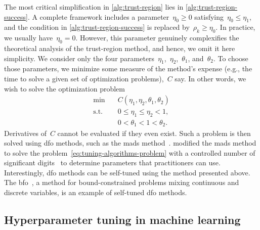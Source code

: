 The most critical simplification in \cref{alg:trust-region} lies in \cref{alg:trust-region-success}.
A complete framework includes a parameter~$\eta_0 \ge 0$ satisfying~$\eta_0 \le \eta_1$, and the condition in \cref{alg:trust-region-success} is replaced by~$\rho_k \ge \eta_0$.
In practice, we usually have~$\eta_0 = 0$.
However, this parameter genuinely complexifies the theoretical analysis of the trust-region method, and hence, we omit it here simplicity.
We consider only the four parameters~$\eta_1$,~$\eta_2$,~$\theta_1$, and~$\theta_2$.
To choose those parameters, we minimize some measure of the method's expense (e.g., the  time to solve a given set of optimization problems),~$C$ say.
In other words, we wish to solve the optimization problem
\begin{subequations}
    \label{eq:tuning-algorithms-problem}
    \begin{align}
        \min        & \quad C(\eta_1, \eta_2, \theta_1, \theta_2)\\
        \text{s.t.} & \quad 0 \le \eta_1 \le \eta_2 < 1,\\
                    & \quad 0 < \theta_1 < 1 < \theta_2.
    \end{align}
\end{subequations}
Derivatives of~$C$ cannot be evaluated if they even exist.
Such a problem is then solved using \gls{dfo} methods, such as the \gls{mads} method~\cite{Audet_Orban_2006}.
 modified the \gls{mads} method to solve the problem~\cref{eq:tuning-algorithms-problem} with a controlled number of significant digits~\cite{Audet_Digabel_Tribes_2019} to determine parameters that practitioners can use.
Interestingly, \gls{dfo} methods can be self-tuned using the method presented above.
The \gls{bfo}~\cite{Porcelli_Toint_2017}, a method for bound-constrained problems mixing continuous and discrete variables, is an example of self-tuned \gls{dfo} methods.

\subsection{Hyperparameter tuning in machine learning}
\label{subsec:machine-learning}

